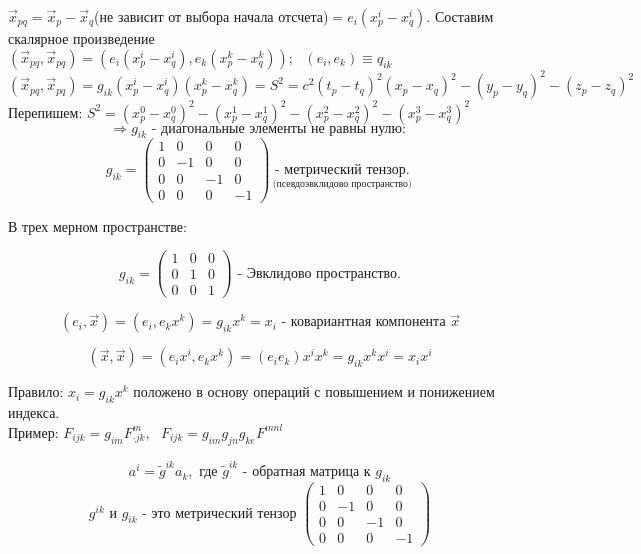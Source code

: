\documentclass[12pt, a4paper]{report}
\begin{document}
\( \vec{x} _{pq} =\vec{x } _p - \vec{x }  _q  \)(не зависит от выбора начала отсчета)\( = e_i (x_p ^ i - x_q ^i ) \). Составим скалярное произведение \( (\vec{x } _{pq  }  , \vec{x } _{pq } ) = (e_i (x_p ^i - x_q ^i ) , e_k  ( x_p ^k - x_q ^k )); \text{ }  (e_i , e_k ) \equiv q_{ik } \)  
\[ (\vec{x } _{pq }  , \vec{x }  _{pq }   ) = g_{ik }  (x_p ^ i - x_q ^i ) (x_p ^k - x_q ^k )  = S ^2 = c ^2 (t_p - t_q )  ^2 ( x_p - x_q ) ^2 - (y_p - y_q ) ^2 - (z_p - z_q ) ^2  \] 
Перепишем: \( S ^2 = (x^0 _ p - x^0 _q ) ^2  -(x^1 _ p - x^1 _q ) ^2-(x^2 _ p - x^2 _q ) ^2-(x^3 _ p - x^3 _q ) ^2\) 
\[ \Rightarrow g_{ik }  \text{ - диагональные элементы не равны нулю:  }   \] 
\[g_{i k } =  \begin{pmatrix}
1& 0 & 0 & 0\\
0 & -1 & 0 & 0\\
0 & 0 & -1 & 0\\
0& 0 &0 & -1
\end{pmatrix} \underset{\text{(псевдоэвклидово пространство)} }{\text{ - метрический тензор. } }\] 

В трех мерном пространстве: 

\[ g_{ik }  =\begin{pmatrix}
1 & 0 & 0\\
0 & 1 & 0\\
0 & 0 & 1
\end{pmatrix} \text{ - Эвклидово пространство.} \] 

\[ (e_i ,\vec{x  } ) = (e_i , e_k x ^k )  = g_{i k }  x^k = x_i \text{ - ковариантная компонента } \vec{x}    \] 

\[ (\vec{x }  , \vec{x } ) = (e_i x ^i , e_k x^k ) = (e_i e_k ) x^i x^k = g_{ik }  x^k x^i = x_i x^i  \] 

Правило: \( x_i = g_{ik }  x^k  \)  положено в основу операций с повышением  и понижением индекса.\\

Пример: \( F_{ij k }  = g_{im }  F^m _{\cdot j k}  , \text{ }  F_{i j k }  = g_{im }  g_{j n } g_{ ke }  F^{mnl}  \) 

\[ a^ i = \tilde{ g }^{ik }  a_k , \text{ где  } \tilde{ g }^{ik }  \text{ - обратная матрица к   } g_{ ik}   \] 
\[ g^{ik } \text{ и } g_{ik } \text{ - это метрический тензор }  \begin{pmatrix}
1 & 0 & 0 & 0\\
0 & -1 & 0 & 0\\
0 & 0 & -1 & 0\\
0 & 0 & 0 & -1
\end{pmatrix} \] \\
\end{document}
